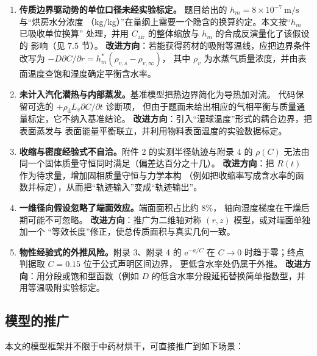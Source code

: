 \begin{enumerate}[leftmargin=2.2em,itemsep=0.3em]
  \item \textbf{传质边界驱动势的单位口径未经实验标定。}
        题目给出的 $h_m=8\times10^{-7}\ \mathrm{m/s}$ 与“烘房水分浓度
        （kg/kg）”在量纲上需要一个隐含的换算约定。本文按“$h_m$ 已吸收单位换算”
        处理，并用 $C_{\mathrm{air}}$ 的整体缩放与 $h_m$ 的合成反演量化了该假设的
        影响（见 7.5 节）。
        \textbf{改进方向}：若能获得药材的吸附等温线，应把边界条件改写为
        $-D\partial C/\partial r=h_m^{\ast}(\rho_{v,s}-\rho_{v,\infty})$，
        其中 $\rho_v$ 为水蒸气质量浓度，并由表面温度查饱和湿度确定平衡含水率。
  \item \textbf{未计入汽化潜热与内部蒸发。}基准模型把热边界简化为导热加对流。
        代码保留可选的 $+\rho_{\mathrm{d}}L_v\partial C/\partial t$ 诊断项，
        但由于题面未给出相应的气相平衡与质量通量标定，它不纳入基准结论。
        \textbf{改进方向}：引入“湿球温度”形式的耦合边界，把表面蒸发与
        表面能量平衡联立，并利用物料表面温度的实验数据标定。
  \item \textbf{收缩与密度经验式不自洽。}附件 2 的实测半径轨迹与附录 4 的
        $\rho(C)$ 无法由同一个固体质量守恒同时满足（偏差达百分之十几）。
        \textbf{改进方向}：把 $R(t)$ 作为待求量，增加固相质量守恒与力学本构
        （例如把收缩率写成含水率的函数并标定），从而把“轨迹输入”变成“轨迹输出”。
  \item \textbf{一维径向假设忽略了端面效应。}端面面积占比约 $8\%$，
        轴向湿度梯度在干燥后期可能不可忽略。
        \textbf{改进方向}：推广为二维轴对称 $(r,z)$ 模型，或对端面单独加一个
        “等效长度”修正，使总传质面积与真实几何一致。
  \item \textbf{物性经验式的外推风险。}附录 3、附录 4 的 $\mathrm{e}^{-a/C}$
        在 $C\to0$ 时趋于零；终点判据取 $C=0.15$ 位于公式声明区间边界，
        更低含水率处仍属于外推。
        \textbf{改进方向}：用分段或饱和型函数（例如
        $D$ 的低含水率分段延拓替换简单指数型，并用等温吸附实验标定。
\end{enumerate}

\subsection{模型的推广}

本文的模型框架并不限于中药材烘干，可直接推广到如下场景：

